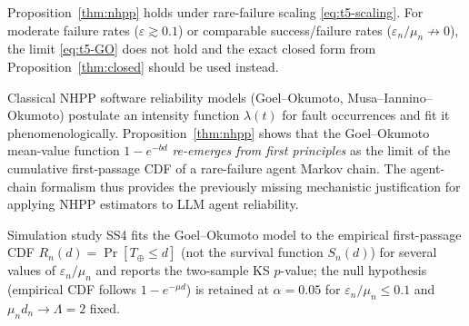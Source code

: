 \begin{remark}
Proposition~\ref{thm:nhpp} holds under rare-failure scaling
\eqref{eq:t5-scaling}.  For moderate failure rates ($\varepsilon
\gtrsim 0.1$) or comparable success/failure rates
($\varepsilon_n/\mu_n\not\to 0$), the limit \eqref{eq:t5-GO} does not
hold and the exact closed form from Proposition~\ref{thm:closed} should
be used instead.
\end{remark}

\begin{remark}
Classical NHPP software reliability models (Goel--Okumoto,
Musa--Iannino--Okumoto) postulate an intensity function $\lambda(t)$
for fault occurrences and fit it phenomenologically.
Proposition~\ref{thm:nhpp} shows that the Goel--Okumoto mean-value
function $1-e^{-bd}$ \emph{re-emerges from first principles} as the
limit of the cumulative first-passage CDF of a rare-failure agent
Markov chain.  The agent-chain formalism thus provides the previously
missing mechanistic justification for applying NHPP estimators to LLM
agent reliability.
\end{remark}

\begin{remark}
Simulation study SS4 fits the Goel--Okumoto model to the empirical
first-passage CDF $R_n(d)=\Pr[T_\oplus\le d]$ (not the survival
function $S_n(d)$) for several values of $\varepsilon_n/\mu_n$ and
reports the two-sample KS $p$-value; the null hypothesis
(empirical CDF follows $1-e^{-\mu d}$) is retained at $\alpha=0.05$
for $\varepsilon_n/\mu_n\le 0.1$ and $\mu_n d_n\to\Lambda=2$ fixed.
\end{remark}
\fi
